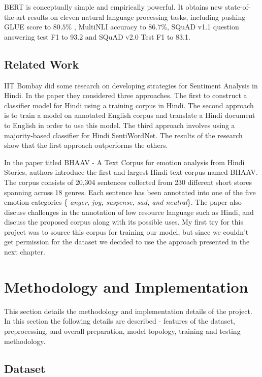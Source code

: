 \documentclass[a4paper, 12pt]{article}
\begin{document}
\begin{sloppypar}
BERT is conceptually simple and empirically powerful. It obtains new state-of-the-art results on eleven natural language processing tasks, including pushing GLUE\cite{wang_glue_2018}
 score to $80.5 \%$ , MultiNLI\cite{williams_broad-coverage_2018}
accuracy to $86.7\%$, SQuAD v1.1\cite{rajpurkar_squad_2016}
question answering test F1 to 93.2  and SQuAD v2.0\cite{rajpurkar_squad_2016}
Test F1 to 83.1.\cite{devlin_bert_2019}

\subsection{Related Work}

IIT Bombay did some research on developing strategies  for Sentiment Analysis in Hindi.  In the paper they considered three approaches. The first to construct a classifier model for Hindi using a training corpus in Hindi. The second approach is to train a model on annotated English corpus and translate a Hindi document to English in order to use this model. The third approach involves using a majority-based classifier for Hindi SentiWordNet. The results of the research show that the first approach outperforms the others.\cite{joshi_fall-back_nodate}

In the paper titled BHAAV - A Text Corpus for emotion analysis from Hindi Stories, authors introduce the first and largest Hindi text corpus named BHAAV. The corpus consists of 20,304 sentences collected from 230 different short stores spanning across 18 genres. Each sentence has been annotated into one of the five emotion categories \{ \textit{anger, joy, suspense, sad, and neutral}\}. The paper also discuss challenges in the annotation of low resource language such as Hindi, and discuss the proposed corpus along with its possible uses.\cite{kumar_bhaav_2019}
My first try for this project was to source this corpus for training our model, but since we couldn't get permission for the dataset we decided to use the approach presented in the next chapter.
\clearpage
\section{Methodology and Implementation}

This section details the methodology and implementation details of the project. In this section the following details are described -  features of the dataset, preprocessing, and overall preparation, model topology, training and testing methodology.

\subsection{Dataset}


\end{sloppypar}
\end{document}
